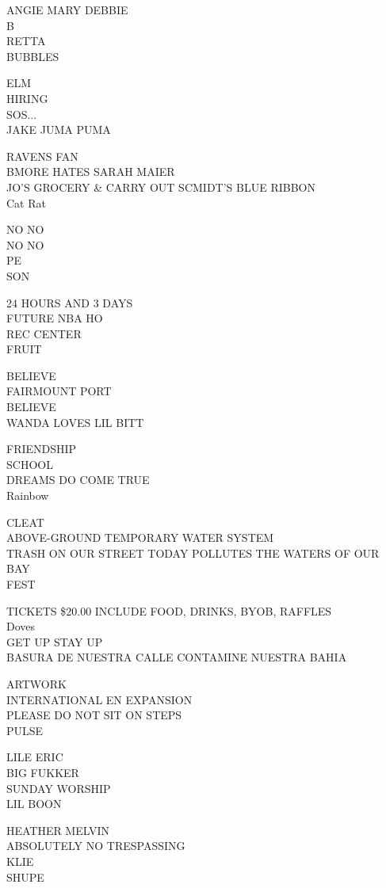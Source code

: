 \documentclass[10pt,letterpaper]{article}
\begin{document}
ANGIE MARY DEBBIE\\
B\\
RETTA\\
BUBBLES

ELM\\
HIRING\\
SOS...\\
JAKE JUMA PUMA

RAVENS FAN\\
BMORE HATES SARAH MAIER\\
JO'S GROCERY \& CARRY OUT SCMIDT'S BLUE RIBBON\\
Cat Rat

NO NO\\
NO NO\\
PE\\
SON

24 HOURS AND 3 DAYS\\
FUTURE NBA HO\\
REC CENTER\\
FRUIT

BELIEVE\\
FAIRMOUNT PORT\\
BELIEVE\\
WANDA LOVES LIL BITT

FRIENDSHIP\\
SCHOOL\\
DREAMS DO COME TRUE\\
Rainbow

CLEAT\\
ABOVE{-}GROUND TEMPORARY WATER SYSTEM\\
TRASH ON OUR STREET TODAY POLLUTES THE WATERS OF OUR BAY\\
FEST

TICKETS \$20.00 INCLUDE FOOD, DRINKS, BYOB, RAFFLES\\
Doves\\
GET UP STAY UP\\
BASURA DE NUESTRA CALLE CONTAMINE NUESTRA BAHIA

ARTWORK\\
INTERNATIONAL EN EXPANSION\\
PLEASE DO NOT SIT ON STEPS\\
PULSE

LILE ERIC\\
BIG FUKKER\\
SUNDAY WORSHIP\\
LIL BOON

HEATHER MELVIN\\
ABSOLUTELY NO TRESPASSING\\
KLIE\\
SHUPE
\end{document}
